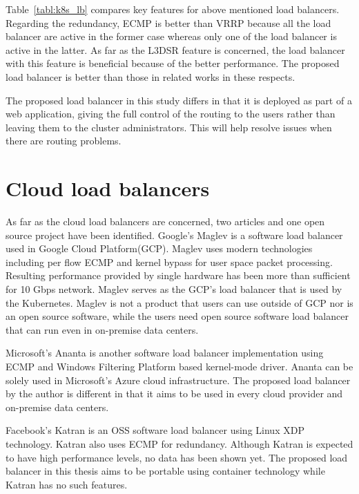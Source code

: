 Table~\ref{tabl:k8s_lb} compares key features for above mentioned load balancers.
Regarding the redundancy, ECMP is better than VRRP because all the load balancer are active in the former case whereas only one of the load balancer is active in the latter.
As far as the L3DSR feature is concerned, the load balancer with this feature is beneficial because of the better performance.
The proposed load balancer is better than those in related works in these respects.

The proposed load balancer in this study differs in that it is deployed as part of a web application, giving the full control of the routing to the users rather than leaving them to the cluster administrators.
This will help resolve issues when there are routing problems.

\section{Cloud load balancers}


As far as the cloud load balancers are concerned, two articles and one open source project have been identified.
Google's Maglev \cite{eisenbud2016maglev} is a software load balancer used in Google Cloud Platform(GCP).
Maglev uses modern technologies including per flow ECMP and kernel bypass for user space packet processing.
Resulting performance provided by single hardware has been more than sufficient for 10 Gbps network.
Maglev serves as the GCP's load balancer that is used by the Kubernetes.
Maglev is not a product that users can use outside of GCP nor is an open source software, while the users need open source software load balancer that can run even in on-premise data centers.

Microsoft's Ananta \cite{patel2013ananta} is another software load balancer implementation using ECMP and Windows Filtering Platform based kernel-mode driver.
Ananta can be solely used in Microsoft's Azure cloud infrastructure\cite{patel2013ananta}.
The proposed load balancer by the author is different in that it aims to be used in every cloud provider and on-premise data centers.

Facebook's Katran \cite{2018katran} is an OSS software load balancer using Linux XDP technology.
Katran also uses ECMP for redundancy.
Although Katran is expected to have high performance levels, no data has been shown yet.
The proposed load balancer in this thesis aims to be portable using container technology while Katran has no such features.

